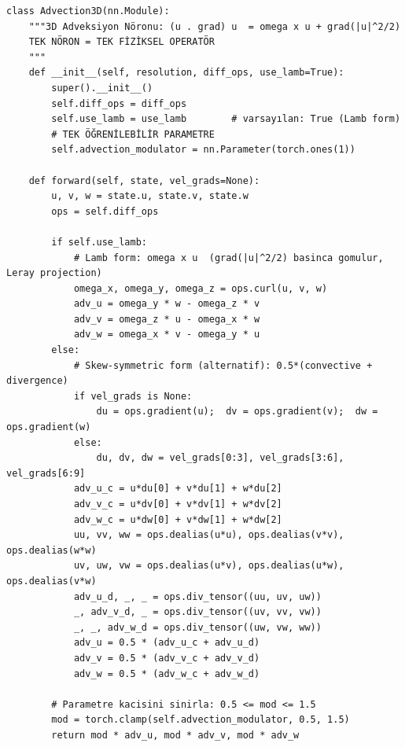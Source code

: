 \begin{lstlisting}[caption={\texttt{Advection3D} nöronu: varsayılan Lamb form (\texttt{use\_lamb=True}); skew-simetrik form alternatif olarak mevcuttur. Tam dosya: \texttt{innate.py:2520+}.}, label={code:advection}]
class Advection3D(nn.Module):
    """3D Adveksiyon Nöronu: (u . grad) u  = omega x u + grad(|u|^2/2)
    TEK NÖRON = TEK FİZİKSEL OPERATÖR
    """
    def __init__(self, resolution, diff_ops, use_lamb=True):
        super().__init__()
        self.diff_ops = diff_ops
        self.use_lamb = use_lamb        # varsayılan: True (Lamb form)
        # TEK ÖĞRENİLEBİLİR PARAMETRE
        self.advection_modulator = nn.Parameter(torch.ones(1))

    def forward(self, state, vel_grads=None):
        u, v, w = state.u, state.v, state.w
        ops = self.diff_ops

        if self.use_lamb:
            # Lamb form: omega x u  (grad(|u|^2/2) basinca gomulur, Leray projection)
            omega_x, omega_y, omega_z = ops.curl(u, v, w)
            adv_u = omega_y * w - omega_z * v
            adv_v = omega_z * u - omega_x * w
            adv_w = omega_x * v - omega_y * u
        else:
            # Skew-symmetric form (alternatif): 0.5*(convective + divergence)
            if vel_grads is None:
                du = ops.gradient(u);  dv = ops.gradient(v);  dw = ops.gradient(w)
            else:
                du, dv, dw = vel_grads[0:3], vel_grads[3:6], vel_grads[6:9]
            adv_u_c = u*du[0] + v*du[1] + w*du[2]
            adv_v_c = u*dv[0] + v*dv[1] + w*dv[2]
            adv_w_c = u*dw[0] + v*dw[1] + w*dw[2]
            uu, vv, ww = ops.dealias(u*u), ops.dealias(v*v), ops.dealias(w*w)
            uv, uw, vw = ops.dealias(u*v), ops.dealias(u*w), ops.dealias(v*w)
            adv_u_d, _, _ = ops.div_tensor((uu, uv, uw))
            _, adv_v_d, _ = ops.div_tensor((uv, vv, vw))
            _, _, adv_w_d = ops.div_tensor((uw, vw, ww))
            adv_u = 0.5 * (adv_u_c + adv_u_d)
            adv_v = 0.5 * (adv_v_c + adv_v_d)
            adv_w = 0.5 * (adv_w_c + adv_w_d)

        # Parametre kacisini sinirla: 0.5 <= mod <= 1.5
        mod = torch.clamp(self.advection_modulator, 0.5, 1.5)
        return mod * adv_u, mod * adv_v, mod * adv_w
\end{lstlisting}

